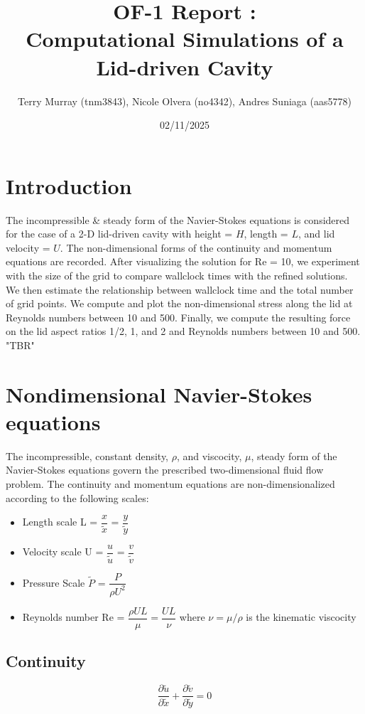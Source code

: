 \documentclass[11pt]{article}
\title{\bf OF-1 Report : \\[2mm] Computational Simulations of a Lid-driven Cavity}
\author{Terry Murray (tnm3843), Nicole Olvera (no4342), Andres Suniaga (aas5778)}
\date{02/11/2025}
\begin{document}
\maketitle

\noindent\makebox[\textwidth]{\rule{\textwidth}{0.2pt}}
\tableofcontents
\noindent\makebox[\textwidth]{\rule{\textwidth}{0.2pt}}
\pagebreak

\section{Introduction}
The incompressible \& steady form of the Navier-Stokes equations is considered for the case of a 2-D lid-driven cavity with height = $H$, length = $L$, and lid velocity = $U$. The non-dimensional forms of the continuity and momentum equations are recorded. After visualizing the solution for Re = 10, we experiment with the size of the grid to compare wallclock times with the refined solutions. We then estimate the relationship between wallclock time and the total number of grid points. We compute and plot the non-dimensional stress along the lid at Reynolds numbers between 10 and 500. Finally, we compute the resulting force on the lid aspect ratios 1/2, 1, and 2 and Reynolds numbers between 10 and 500. "TBR"


\section{Nondimensional Navier-Stokes equations}
The incompressible, constant density, $\rho$, and viscocity, $\mu$, steady form of the Navier-Stokes equations govern the prescribed two-dimensional fluid flow problem. The continuity and momentum equations are non-dimensionalized according to the following scales:
\begin{itemize}
    \item Length scale L = $\dfrac{x}{\tilde{x}}$ = $\dfrac{y}{\tilde{y}}$
    \item Velocity scale U = $\dfrac{u}{\tilde{u}}$ = $\dfrac{v}{\tilde{v}}$
    \item Pressure Scale $\tilde{P}$ = $\dfrac{P}{\rho U^2}$
    \item Reynolds number Re = $\dfrac{\rho UL}{\mu} = \dfrac{UL}{\nu}$ where $\nu = \mu/\rho$ is the kinematic viscocity
\end{itemize}

\subsection*{Continuity}
\begin{equation*}
    \frac{\partial \tilde{u}}{\partial \tilde{x}} + \frac{\partial \tilde{v}}{\partial \tilde{y}} = 0
\end{equation*}
\end{document}
